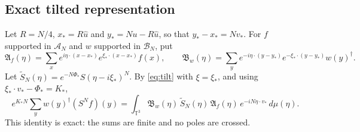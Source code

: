 \documentclass[11pt]{amsart}
\theoremstyle{definition}
\theoremstyle{remark}
\newcommand{\T}{\mathbb{T}}
\newcommand{\cA}{\mathcal{A}}
\newcommand{\cB}{\mathcal{B}}
\newcommand{\uhat}{\hat u}
\begin{document}
\subsection{Exact tilted representation}
Let $R=N/4$, $x_*=R\uhat$ and $y_*=N u-R\uhat$, so that $y_*-x_*=Nv_*$.  For
$f$ supported in $\cA_N$ and $w$ supported in $\cB_N$, put
\[
\mathfrak A_f(\eta)=\sum_xe^{i\eta\cdot(x-x_*)}e^{\xi_*\cdot(x-x_*)}f(x),\qquad
\mathfrak B_w(\eta)=\sum_ye^{-i\eta\cdot(y-y_*)}e^{-\xi_*\cdot(y-y_*)}w(y)^\dagger .
\]
Let $\widetilde S_N(\eta)=e^{-N\Phi_*}S(\eta-i\xi_*)^N$.  By \eqref{eq:tilt}
with $\xi=\xi_*$, and using $\xi_*\cdot v_*-\Phi_*=K_*$,
\begin{equation}\label{eq:exactrep}
e^{K_*N}\sum_yw(y)^\dagger(S^Nf)(y)=\int_{\T^3}\mathfrak B_w(\eta)\,\widetilde S_N(\eta)\,\mathfrak A_f(\eta)\,e^{-iN\eta\cdot v_*}\,d\mu(\eta).
\end{equation}
This identity is exact: the sums are finite and no poles are crossed.
\end{document}
